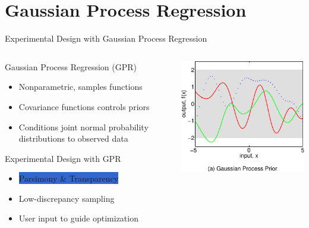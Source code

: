 \documentclass[10pt, compress, aspectratio=169, xcolor={table,usenames,dvipsnames}]{beamer}
\begin{document}
\section{Gaussian Process Regression}
\label{sec:org1d0d5da}
\begin{frame}[label={sec:org1579b5e}]{Experimental Design with Gaussian Process Regression}
\begin{columns}
\begin{column}{0.5\columnwidth}
\begin{block}{Gaussian Process Regression (GPR)}
\begin{itemize}
\item \alert{Nonparametric}, samples \alert{functions}
\item \alert{Covariance} functions controls priors
\item \alert{Conditions} joint normal probability distributions to \alert{observed data}
\end{itemize}
\begin{block}{Experimental Design with GPR}
\begin{itemize}
\item \colorbox{Highlight}{\alert{Parsimony} \& \alert{Transparency}}
\item \alert{Low-discrepancy} sampling
\item User input to guide optimization
\end{itemize}
\end{block}
\end{block}
\end{column}
\begin{column}{0.5\columnwidth}
\begin{center}
\includegraphics[width=.99\columnwidth]{../../../img/rasmussen_prior.pdf}
\end{center}

\end{column}
\end{columns}
\end{frame}
\end{document}
